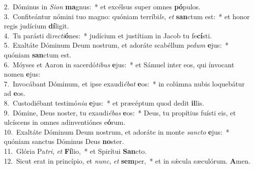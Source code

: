 {2.~}Dóminus in \textit{Si}\textit{on} \textbf{ma}gnus:~* et excélsus super omnes \textbf{pó}pulos.\\
{3.~}Confiteántur nómini tuo magno: quóniam terríbi\textit{le}, \textit{et} \textbf{san}ctum est:~* et honor regis judícium \textbf{dí}ligit.\\
{4.~}Tu parásti di\textit{re}\textit{cti}\textbf{ó}nes:~* judícium et justítiam in Jacob tu fe\textbf{cí}sti.\\
{5.~}Exaltáte Dóminum Deum nostrum, et adoráte scabéllum \textit{pe}\textit{dum} \textbf{e}jus:~* quóniam \textbf{san}ctum est.\\
{6.~}Móyses et Aaron in sacerdó\textit{ti}\textit{bus} \textbf{e}jus:~* et Sámuel inter eos, qui ínvocant nomen \textbf{e}jus:\\
{7.~}Invocábant Dóminum, et ipse exaudi\textit{é}\textit{bat} \textbf{e}os:~* in colúmna nubis loquebátur ad \textbf{e}os.\\
{8.~}Custodiébant testimó\textit{ni}\textit{a} \textbf{e}jus:~* et præcéptum quod dedit \textbf{il}lis.\\
{9.~}Dómine, Deus noster, tu exaudi\textit{é}\textit{bas} \textbf{e}os:~* Deus, tu propítius fuísti eis, et ulcíscens in omnes adinventiónes e\textbf{ó}rum.\\
{10.~}Exaltáte Dóminum Deum nostrum, et adoráte in monte \textit{san}\textit{cto} \textbf{e}jus:~* quóniam sanctus Dóminus Deus \textbf{no}ster.\\
{11.~}Glória Pa\textit{tri}, \textit{et} \textbf{Fí}lio,~* et Spirítui \textbf{San}cto.\\
{12.~}Sicut erat in princípio, et \textit{nunc}, \textit{et} \textbf{sem}per,~* et in sǽcula sæculórum. \textbf{A}men.\\
